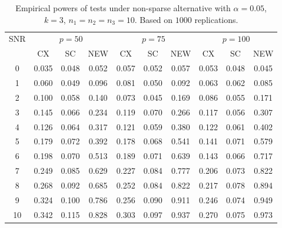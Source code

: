 \documentclass[review]{elsarticle}
\DeclareMathOperator{\mytr}{tr}
\theoremstyle{plain}
\theoremstyle{definition}
\theoremstyle{remark}
\begin{document}


\begin{table}[!hbp]
    \caption{Empirical powers of tests under non-sparse alternative with $\alpha=0.05$, $k=3$, $n_1=n_2=n_3=10$. Based on $1000$ replications.}
    \centering
    \begin{tabular}{*{10}{c}}
    \toprule
    \multirow{2}{*}{SNR} &\multicolumn{3}{c}{$p=50$}&\multicolumn{3}{c}{$p=75$}&\multicolumn{3}{c}{$p=100$} \\
        \cmidrule(r){2-4}\cmidrule(r){5-7}\cmidrule(r){8-10}
        & CX & SC & NEW & CX &SC &NEW &CX & SC & NEW\\
    \midrule
0 & 0.035 & 0.048 & 0.052 & 0.057 & 0.052 & 0.057 & 0.053 & 0.048 & 0.045 \\ 
1 & 0.060 & 0.049 & 0.096 & 0.081 & 0.050 & 0.092 & 0.063 & 0.062 & 0.085 \\ 
2 & 0.100 & 0.058 & 0.140 & 0.073 & 0.045 & 0.169 & 0.086 & 0.055 & 0.171 \\ 
3 & 0.145 & 0.066 & 0.234 & 0.119 & 0.070 & 0.266 & 0.117 & 0.056 & 0.307 \\ 
4 & 0.126 & 0.064 & 0.317 & 0.121 & 0.059 & 0.380 & 0.122 & 0.061 & 0.402 \\ 
5 & 0.179 & 0.072 & 0.392 & 0.178 & 0.068 & 0.541 & 0.141 & 0.071 & 0.579 \\ 
6 & 0.198 & 0.070 & 0.513 & 0.189 & 0.071 & 0.639 & 0.143 & 0.066 & 0.717 \\ 
7 & 0.249 & 0.085 & 0.629 & 0.227 & 0.084 & 0.777 & 0.206 & 0.073 & 0.822 \\ 
8 & 0.268 & 0.092 & 0.685 & 0.252 & 0.084 & 0.822 & 0.217 & 0.078 & 0.894 \\ 
9 & 0.324 & 0.100 & 0.786 & 0.256 & 0.090 & 0.911 & 0.246 & 0.074 & 0.949 \\ 
10 & 0.342 & 0.115 & 0.828 & 0.303 & 0.097 & 0.937 & 0.270 & 0.075 & 0.973 \\ 
\bottomrule
\end{tabular}
\end{table}
\end{document}
